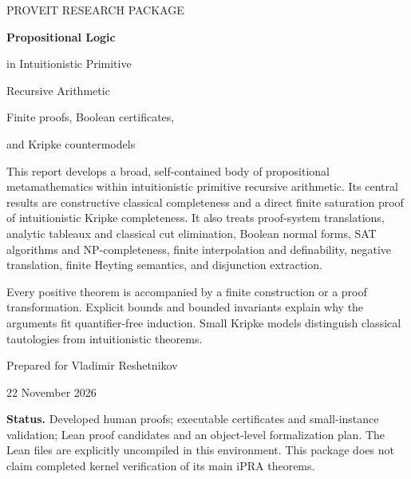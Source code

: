 \documentclass[11pt,a4paper]{article}
\theoremstyle{definition}
\begin{document}
\begin{titlepage}
\color{navy}
{\large\sffamily PROVEIT RESEARCH PACKAGE}\par
\vspace{18mm}
{\Huge\bfseries Propositional Logic}\par
\vspace{4mm}
{\LARGE in Intuitionistic Primitive\par Recursive Arithmetic}\par
\vspace{12mm}
{\Large\sffamily Finite proofs, Boolean certificates,\par and Kripke countermodels}\par
\vspace{13mm}
\color{black}
\begin{minipage}{.91\textwidth}
This report develops a broad, self-contained body of propositional
metamathematics within intuitionistic primitive recursive arithmetic.
Its central results are constructive classical completeness and a direct
finite saturation proof of intuitionistic Kripke completeness. It also
treats proof-system translations, analytic tableaux and classical cut
elimination, Boolean normal forms, SAT algorithms and NP-completeness,
finite interpolation and definability, negative translation, finite
Heyting semantics, and disjunction extraction.

Every positive theorem is accompanied by a finite construction or a proof
transformation. Explicit bounds and bounded invariants explain why the
arguments fit quantifier-free induction. Small Kripke models distinguish
classical tautologies from intuitionistic theorems.
\end{minipage}
\vfill
\color{navy}
{\large Prepared for Vladimir Reshetnikov}\par
{\large 22 November 2026}\par
\vspace{6mm}
\color{black}
\small
\textbf{Status.} Developed human proofs; executable certificates and
small-instance validation; Lean proof candidates and an object-level
formalization plan. The Lean files are explicitly uncompiled in this
environment. This package does not claim completed kernel verification
of its main iPRA theorems.
\end{titlepage}

\tableofcontents
\clearpage







\appendix



\end{document}
